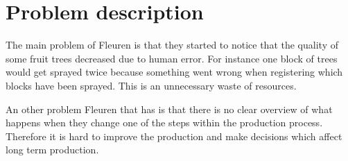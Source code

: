 \section{Problem description}
The main problem of Fleuren is that they started to notice that the quality of some fruit trees decreased due to human error. For instance  one block of trees would get sprayed twice because something went wrong when registering which blocks have been sprayed. This is an unnecessary waste of resources.

An other problem Fleuren that has is that there is no clear overview of what happens when they change one of the steps within the production process. Therefore it is hard to improve the production and make decisions which affect long term production.